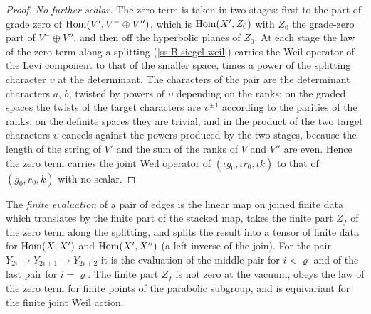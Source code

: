 \begin{proof}
\emph{No further scalar.} The zero term is taken in two stages: first to the part of grade zero of $\operatorname{Hom}(V',V^-\oplus V'')$, which is $\operatorname{Hom}(X',Z_0)$ with $Z_0$ the grade-zero part of $V^-\oplus V''$, and then off the hyperbolic planes of $Z_0$. At each stage the law of the zero term along a splitting
(\cref{ss:B-siegel-weil}) carries the Weil operator of the Levi component to that of the smaller space, times a power of the splitting character $\upsilon$ at the determinant. The characters of the pair are the determinant characters $a$, $b$, twisted by powers of $\upsilon$ depending on the ranks; on the graded spaces the twists of the target characters are
$\upsilon^{\pm1}$ according to the parities of the ranks, on the definite spaces they are trivial, and in the product of the two target characters $\upsilon$ cancels against the powers produced by the two stages, because the length of the string of $V'$ and the sum of the ranks of $V$ and $V''$ are even. Hence the zero term carries the joint Weil
operator of $(\iota g_0,\iota r_0,\iota k)$ to that of $(g_0,r_0,k)$ with no scalar.
\end{proof}

The \emph{finite evaluation} of a pair of edges is the linear map on joined finite data which translates by the finite
part of the stacked map, takes the finite part $Z_f$ of the zero term along the splitting, and splits the result into a
tensor of finite data for $\operatorname{Hom}(X,X')$ and $\operatorname{Hom}(X',X'')$ (a left inverse of the join). For the pair
$Y_{2i}\to Y_{2i+1}\to Y_{2i+2}$ it is the evaluation of the middle pair for $i<\varrho$ and of the last pair for
$i=\varrho$. The finite part $Z_f$ is not zero at the vacuum, obeys the law of the zero term for finite points of the
parabolic subgroup, and is equivariant for the finite joint Weil action.

